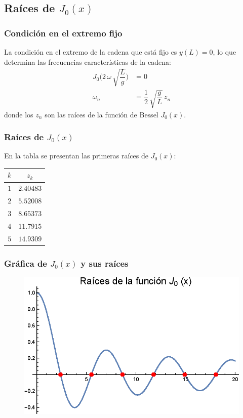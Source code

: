 \documentclass[12pt]{beamer}
\begin{document}
\subsection{Raíces de \texorpdfstring{$J_{0} (x)$}{J0 (x)}}

\begin{frame}
\frametitle{Condición en el extremo fijo}
La condición en el extremo de la cadena que está fijo es $y (L) = 0$, lo que determina las frecuencias características de la cadena:
\pause
\begin{align}
J_{0} \bigg( 2 \, \omega \, \sqrt{\dfrac{L}{g}} \bigg) &= 0 \label{eq:ecuacion_25} \\[0.5em]
\omega_{n} &= \dfrac{1}{2} \, \sqrt{\dfrac{g}{L}} \, z_{n} \label{eq:ecuacion_26}
\end{align}
\pause
donde los $z_{n}$ son las raíces de la función de Bessel $J_{0} (x)$.
\end{frame}
\begin{frame}
\frametitle{Raíces de $J_{0} (x)$}
En la tabla se presentan las primeras raíces de $J_{0} (x)$:
\pause
\begin{table}[H]
\centering
\large
\renewcommand{\arraystretch}{0.8}
\begin{tabular}{c | c}
$k$ & $z_{k}$ \\ \hline
$1$ & $2.40483$ \\
$2$ & $5.52008$ \\
$3$ & $8.65373$ \\
$4$ & $11.7915$ \\
$5$ & $14.9309$ \\
\end{tabular}
\end{table}
\end{frame}
\begin{frame}
\frametitle{Gráfica de $J_{0} (x)$ y sus raíces}
\begin{figure}[H]
    \centering
    \includegraphics[scale=1]{Imagenes/Plot_Bessel_Cadena_01_Raices_J0.eps}
\end{figure}
\end{frame}
\end{document}

